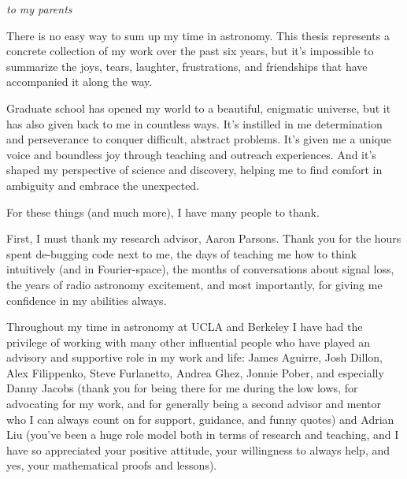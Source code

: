 \documentclass[12pt]{myucthesis}
\begin{document}
\hypersetup{pageanchor=true}
\begin{frontmatter}

\begin{dedication}
\null\vfil
{\large
\begin{center}
\textit{to my parents}
\end{center}}
\null\vfil
\end{dedication}

\tableofcontents
\listoffigures %
\listoftables %


\begin{acknowledgements}
There is no easy way to sum up my time in astronomy. This thesis represents a concrete collection of my work over the past six years, but it's impossible to summarize the joys, tears, laughter, frustrations, and friendships that have accompanied it along the way.

Graduate school has opened my world to a beautiful, enigmatic universe, but it has also given back to me in countless ways. It's instilled in me determination and perseverance to conquer difficult, abstract problems. It's given me a unique voice and boundless joy through teaching and outreach experiences. And it's shaped my perspective of science and discovery, helping me to find comfort in ambiguity and embrace the unexpected.

For these things (and much more), I have many people to thank. 

First, I must thank my research advisor, Aaron Parsons. Thank you for the hours spent de-bugging code next to me, the days of teaching me how to think intuitively (and in Fourier-space), the months of conversations about signal loss, the years of radio astronomy excitement, and most importantly, for giving me confidence in my abilities always. 

Throughout my time in astronomy at UCLA and Berkeley I have had the privilege of working with many other influential people who have played an advisory and supportive role in my work and life: James Aguirre, Josh Dillon, Alex Filippenko, Steve Furlanetto, Andrea Ghez, Jonnie Pober, and especially Danny Jacobs (thank you for being there for me during the low lows, for advocating for my work, and for generally being a second advisor and mentor who I can always count on for support, guidance, and funny quotes) and Adrian Liu (you've been a huge role model both in terms of research and teaching, and I have so appreciated your positive attitude, your willingness to always help, and yes, your mathematical proofs and lessons).


\end{acknowledgements}
\end{frontmatter}
\end{document}

